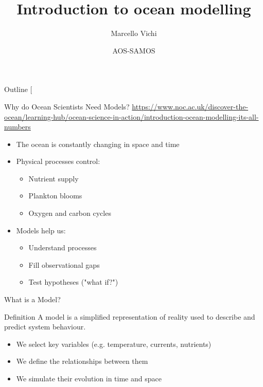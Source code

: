 \documentclass[english,aspectratio=169]{beamer}
\makeatletter
\let\origtableofcontents=\tableofcontents
\def\tableofcontents{\@ifnextchar[{\origtableofcontents}{\gobbletableofcontents}}
\def\gobbletableofcontents#1{\origtableofcontents}
\makeatother
\begin{document}
    \title[EC ]{Introduction to ocean modelling}
    \author{Marcello Vichi}
    \date{AOS-SAMOS}
    \maketitle

\begin{frame}{Outline}
    \tableofcontents{}
\end{frame}


\begin{frame}{Why do Ocean Scientists Need Models?}
\url{https://www.noc.ac.uk/discover-the-ocean/learning-hub/ocean-science-in-action/introduction-ocean-modelling-its-all-numbers}
\begin{itemize}
\item The ocean is constantly changing in space and time
\item Physical processes control:
\begin{itemize}
\item Nutrient supply
\item Plankton blooms
\item Oxygen and carbon cycles
\end{itemize}
\item Models help us:
\begin{itemize}
\item Understand processes
\item Fill observational gaps
\item Test hypotheses ("what if?")
\end{itemize}
\end{itemize}
\end{frame}

\begin{frame}{What is a Model?}
\begin{block}{Definition}
A model is a simplified representation of reality used to describe and predict system behaviour.
\end{block}

\begin{itemize}
\item We select key variables (e.g. temperature, currents, nutrients)
\item We define the relationships between them
\item We simulate their evolution in time and space
\end{itemize}
\end{frame}
\end{document}

